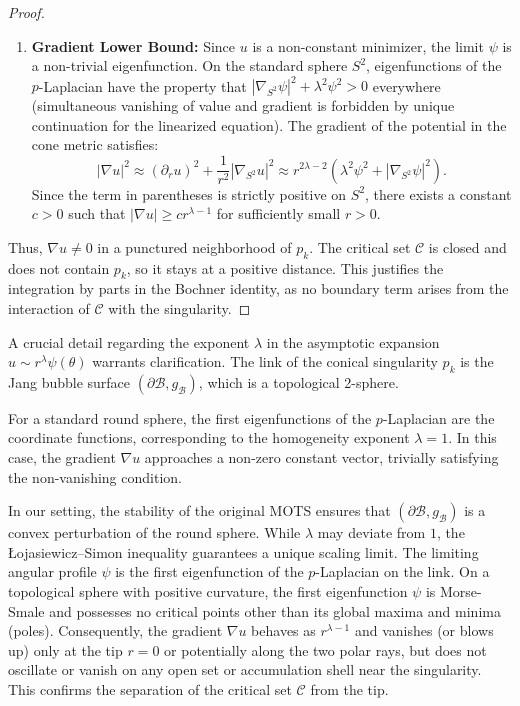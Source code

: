 \begin{proof}
\begin{enumerate}
    \item \textbf{Gradient Lower Bound:} Since $u$ is a non-constant minimizer, the limit $\psi$ is a non-trivial eigenfunction.
    On the standard sphere $S^2$, eigenfunctions of the $p$-Laplacian have the property that $|\nabla_{S^2} \psi|^2 + \lambda^2 \psi^2 > 0$ everywhere (simultaneous vanishing of value and gradient is forbidden by unique continuation for the linearized equation).
    The gradient of the potential in the cone metric satisfies:
    \[ |\nabla u|^2 \approx (\partial_r u)^2 + \frac{1}{r^2} |\nabla_{S^2} u|^2 \approx r^{2\lambda-2} (\lambda^2 \psi^2 + |\nabla_{S^2} \psi|^2). \]
    Since the term in parentheses is strictly positive on $S^2$, there exists a constant $c > 0$ such that $|\nabla u| \ge c r^{\lambda-1}$ for sufficiently small $r > 0$.
\end{enumerate}
Thus, $\nabla u \neq 0$ in a punctured neighborhood of $p_k$. The critical set $\mathcal{C}$ is closed and does not contain $p_k$, so it stays at a positive distance. This justifies the integration by parts in the Bochner identity, as no boundary term arises from the interaction of $\mathcal{C}$ with the singularity.
\end{proof}

\begin{remark}\label{rem:SpectralGap}
A crucial detail regarding the exponent $\lambda$ in the asymptotic expansion $u \sim r^\lambda \psi(\theta)$ warrants clarification. The link of the conical singularity $p_k$ is the Jang bubble surface $(\partial \mathcal{B}, g_{\mathcal{B}})$, which is a topological 2-sphere.

For a standard round sphere, the first eigenfunctions of the $p$-Laplacian are the coordinate functions, corresponding to the homogeneity exponent $\lambda = 1$. In this case, the gradient $\nabla u$ approaches a non-zero constant vector, trivially satisfying the non-vanishing condition.

In our setting, the stability of the original MOTS ensures that $(\partial \mathcal{B}, g_{\mathcal{B}})$ is a convex perturbation of the round sphere. While $\lambda$ may deviate from $1$, the \L{}ojasiewicz--Simon inequality guarantees a unique scaling limit. The limiting angular profile $\psi$ is the first eigenfunction of the $p$-Laplacian on the link. On a topological sphere with positive curvature, the first eigenfunction $\psi$ is Morse-Smale and possesses no critical points other than its global maxima and minima (poles). Consequently, the gradient $\nabla u$ behaves as $r^{\lambda-1}$ and vanishes (or blows up) only at the tip $r=0$ or potentially along the two polar rays, but does not oscillate or vanish on any open set or accumulation shell near the singularity. This confirms the separation of the critical set $\mathcal{C}$ from the tip.
\end{remark}

